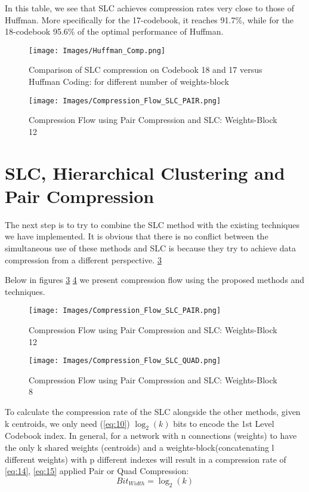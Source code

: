 In this table, we see that SLC achieves compression rates very close to those of Huffman. More specifically for the 17-codebook, it reaches 91.7\%, while for the 18-codebook 95.6\% of the optimal performance of Huffman.

\begin{figure}[h]
\centering
\texttt{[image: Images/Huffman\_Comp.png]} 
\decoRule
\caption[Comparison of SLC compression on Codebook 18 and 17 versus Huffman Coding]{Comparison of SLC compression on Codebook 18 and 17 versus Huffman Coding: for different number of weights-block
}
\label{fig:huff}
\end{figure}


\begin{figure}[h]
\centering
\texttt{[image: Images/Compression\_Flow\_SLC\_PAIR.png]} 
\decoRule
\caption[Compression Flow using Pair Compression and SLC]{Compression Flow using Pair Compression and SLC: Weights-Block 12 
}
\label{fig:comp_slc_pair}
\end{figure}


\section{SLC, Hierarchical Clustering and Pair Compression }
The next step is to try to combine the SLC method with the existing techniques we have implemented. It is obvious that there is no conflict between the simultaneous use of these methods and SLC is because they try to achieve data compression from a different perspective. \ref{fig:comp_slc_pair}

Below in figures \ref{fig:comp_slc_pair} \ref{fig:comp_slc_quad} we present compression flow using the proposed methods and techniques.

\begin{figure}[h]
\centering
\texttt{[image: Images/Compression\_Flow\_SLC\_PAIR.png]} 
\decoRule
\caption[Compression Flow using Pair Compression and SLC]{Compression Flow using Pair Compression and SLC: Weights-Block 12 
}
\label{fig:comp_slc_pair}
\end{figure}


\begin{figure}[h]
\centering
\texttt{[image: Images/Compression\_Flow\_SLC\_QUAD.png]} 
\decoRule
\caption[Compression Flow using Quad Compression and SLC]{Compression Flow using Pair Compression and SLC: Weights-Block 8 
}
\label{fig:comp_slc_quad}
\end{figure}
  To calculate the compression rate of the SLC alongside the other methods, given k centroids, we only need (\ref{eq:10}) $\log_2(k)$ bits to encode the 1st Level Codebook index. In general, for a network with n connections (weights) to have the only k shared weights (centroids) and a weights-block(concatenating l different weights) with p different indexes will result in a compression rate of \ref{eq:14}, \ref{eq:15} applied Pair or Quad Compression: 
\begin{equation}\label{eq:13}
  Bit_{Width}= \log_2(k) \end{equation}
 
